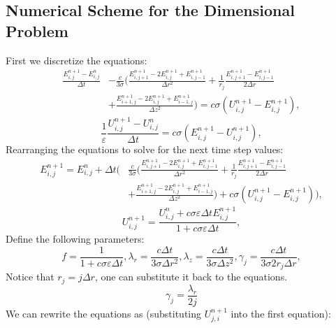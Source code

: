 \documentclass{article}
\begin{document}
\subsection*{Numerical Scheme for the Dimensional Problem}
First we discretize the equations:
\begin{equation}
\begin{split}
\frac{E^{n+1}_{i,j}-E^{n}_{i,j}}{\Delta t} & - \frac{c}{3\sigma} \Biggl( \frac{E^{n+1}_{i,j+1}-2E^{n+1}_{i,j}+E^{n+1}_{i,j-1}}{\Delta r^2}
    + \frac{1}{r_j}\frac{E^{n+1}_{i,j+1}-E^{n+1}_{i,j-1}}{2\Delta r} \\
& + \frac{E^{n+1}_{i+1,j}-2E^{n+1}_{i,j}+E^{n+1}_{i-1,j}}{\Delta z^2} \Biggr) = c\sigma(U^{n+1}_{i,j} - E^{n+1}_{i,j}),
\end{split}
\end{equation}
\begin{equation}
\frac{1}{\varepsilon}\frac{U^{n+1}_{i,j}-U^{n}_{i,j}}{\Delta t} = c\sigma(E^{n+1}_{i,j} - U^{n+1}_{i,j}),
\end{equation}
Rearranging the equations to solve for the next time step values:
\begin{equation}
\begin{split}
E^{n+1}_{i,j} = E^{n}_{i,j} + \Delta t \Biggl( & \frac{c}{3\sigma} \Biggl( \frac{E^{n+1}_{i,j+1}-2E^{n+1}_{i,j}+E^{n+1}_{i,j-1}}{\Delta r^2}
    + \frac{1}{r_j}\frac{E^{n+1}_{i,j+1}-E^{n+1}_{i,j-1}}{2\Delta r} \\
& + \frac{E^{n+1}_{i+1,j}-2E^{n+1}_{i,j}+E^{n+1}_{i-1,j}}{\Delta z^2} \Biggr) + c\sigma(U^{n+1}_{i,j} - E^{n+1}_{i,j}) \Biggr),
\end{split}
\end{equation}
\begin{equation}
U^{n+1}_{i,j} = \frac{U^{n}_{i,j} + c\sigma \varepsilon \Delta t E^{n+1}_{i,j}}{1 + c\sigma \varepsilon \Delta t},
\end{equation}
Define the following parameters:
\begin{equation}
f = \frac{1}{1+c\sigma \varepsilon \Delta t}, \lambda_r = \frac{c\Delta t}{3\sigma \Delta r^2}, \lambda_z = \frac{c\Delta t}{3\sigma \Delta z^2}, 
\gamma_j = \frac{c\Delta t}{3\sigma 2r_j \Delta r},
\end{equation}
Notice that $r_j = j\Delta r$, one can substitute it back to the equations.
\begin{equation}
    \gamma_j = \frac{\lambda_r}{2j}
\end{equation}
We can rewrite the equations as (substituting $U^{n+1}_{j,i}$ into the first equation):
\end{document}

